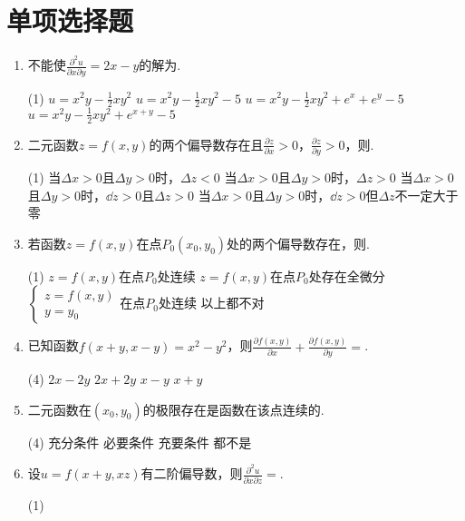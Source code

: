 \section{单项选择题}
\begin{enumerate}
	\item 不能使$\frac{\partial^2 u }{\partial x \partial y } = 2x - y $的解为\emptychoice .
		\begin{choice}(1)
			\choice $ u = x^2 y - \frac{1}{2} x y^2 $
			\choice $ u = x^2 y - \frac{1}{2} x y^2 -5 $
			\choice $ u = x^2 y - \frac{1}{2} x y^2 + e^x + e^y -5 $
			\choice $ u = x^2 y - \frac{1}{2} x y^2 + e^{x+y} -5 $
		\end{choice}
	\item 二元函数$z=f(x,y)$的两个偏导数存在且$\frac{\partial z}{\partial x}>0$，$\frac{\partial z}{\partial y}>0$，则\emptychoice .
		\begin{choice}(1)
			\choice 当$\Delta x > 0$且$\Delta y > 0$时，$\Delta z<0$
			\choice 当$\Delta x > 0$且$\Delta y > 0$时，$\Delta z>0$
			\choice 当$\Delta x > 0$且$\Delta y > 0$时，$\dd z > 0$且$\Delta z>0$
			\choice 当$\Delta x > 0$且$\Delta y > 0$时，$\dd z > 0$但$\Delta z$不一定大于零
		\end{choice}
	\item 若函数$z=f(x,y)$在点$P_0(x_0,y_0)$处的两个偏导数存在，则\emptychoice .
		\begin{choice}(1)
			\choice $z=f(x,y)$在点$P_0$处连续
			\choice $z=f(x,y)$在点$P_0$处存在全微分
			\choice $\begin{cases}
z=f(x,y)\\
y=y_0
\end{cases}$在点$P_0$处连续
			\choice 以上都不对
		\end{choice}
	\item 已知函数$f(x+y,x-y)=x^2-y^2$，则$\frac{\partial f(x,y)}{\partial x}+\frac{\partial f(x,y)}{\partial y} = $\emptychoice .
		\begin{choice}(4)
			\choice $2x-2y$
			\choice $2x+2y$
			\choice $ x-y $
			\choice $ x+y $
		\end{choice}
	\item 二元函数在$ (x_0,y_0) $的极限存在是函数在该点连续的\emptychoice .
		\begin{choice}(4)
			\choice 充分条件
			\choice 必要条件
			\choice 充要条件
			\choice 都不是
		\end{choice}
	\item 设$ u=f(x+y,xz) $有二阶偏导数，则$ \frac{\partial^2 u}{\partial x \partial z}= $\emptychoice .
		\begin{choice}(1)

\end{choice}
\end{enumerate}

